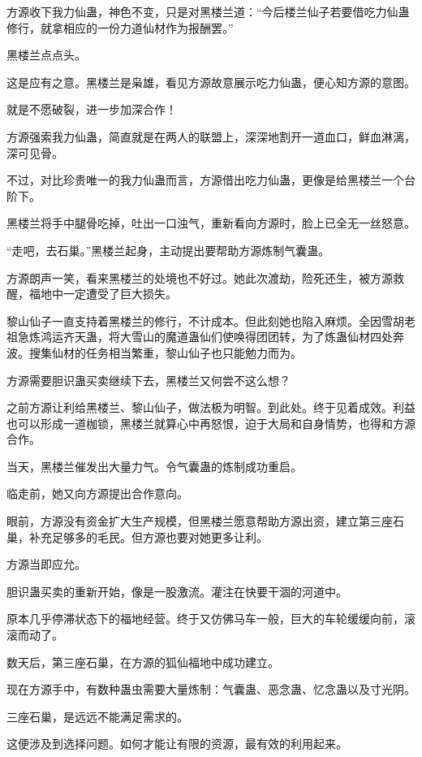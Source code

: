 
\begin{this_body}

方源收下我力仙蛊，神色不变，只是对黑楼兰道：“今后楼兰仙子若要借吃力仙蛊修行，就拿相应的一份力道仙材作为报酬罢。”

黑楼兰点点头。

这是应有之意。黑楼兰是枭雄，看见方源故意展示吃力仙蛊，便心知方源的意图。

就是不愿破裂，进一步加深合作！

方源强索我力仙蛊，简直就是在两人的联盟上，深深地割开一道血口，鲜血淋漓，深可见骨。

不过，对比珍贵唯一的我力仙蛊而言，方源借出吃力仙蛊，更像是给黑楼兰一个台阶下。

黑楼兰将手中腿骨吃掉，吐出一口浊气，重新看向方源时，脸上已全无一丝怒意。

“走吧，去石巢。”黑楼兰起身，主动提出要帮助方源炼制气囊蛊。

方源朗声一笑，看来黑楼兰的处境也不好过。她此次渡劫，险死还生，被方源救醒，福地中一定遭受了巨大损失。

黎山仙子一直支持着黑楼兰的修行，不计成本。但此刻她也陷入麻烦。全因雪胡老祖急炼鸿运齐天蛊，将大雪山的魔道蛊仙们使唤得团团转，为了炼蛊仙材四处奔波。搜集仙材的任务相当繁重，黎山仙子也只能勉力而为。

方源需要胆识蛊买卖继续下去，黑楼兰又何尝不这么想？

之前方源让利给黑楼兰、黎山仙子，做法极为明智。到此处。终于见着成效。利益也可以形成一道枷锁，黑楼兰就算心中再怒恨，迫于大局和自身情势，也得和方源合作。

当天，黑楼兰催发出大量力气。令气囊蛊的炼制成功重启。

临走前，她又向方源提出合作意向。

眼前，方源没有资金扩大生产规模，但黑楼兰愿意帮助方源出资，建立第三座石巢，补充足够多的毛民。但方源也要对她更多让利。

方源当即应允。

胆识蛊买卖的重新开始，像是一股激流。灌注在快要干涸的河道中。

原本几乎停滞状态下的福地经营。终于又仿佛马车一般，巨大的车轮缓缓向前，滚滚而动了。

数天后，第三座石巢，在方源的狐仙福地中成功建立。

现在方源手中，有数种蛊虫需要大量炼制：气囊蛊、恶念蛊、忆念蛊以及寸光阴。

三座石巢，是远远不能满足需求的。

这便涉及到选择问题。如何才能让有限的资源，最有效的利用起来。


\end{this_body}
